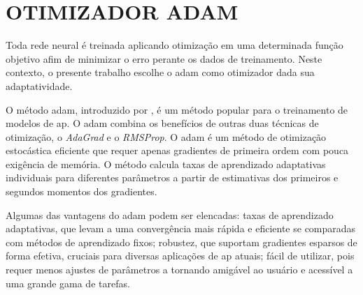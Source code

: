 \section{OTIMIZADOR ADAM}
\label{sec:adam}

Toda rede neural é treinada aplicando otimização em uma determinada função objetivo afim de minimizar o erro perante os dados de treinamento. Neste contexto, o presente trabalho escolhe o \gls{adam} como otimizador dada sua adaptatividade.

O método \gls{adam}, introduzido por , é um método popular para o treinamento de modelos de \gls{ap}. O \gls{adam} combina os benefícios de outras duas técnicas de otimização, o \textit{AdaGrad} e o \textit{RMSProp}. O \gls{adam} é um método de otimização estocástica eficiente que requer apenas gradientes de primeira ordem com pouca exigência de memória. O método calcula taxas de aprendizado adaptativas individuais para diferentes parâmetros a partir de estimativas dos primeiros e segundos momentos dos gradientes.

Algumas das vantagens do \gls{adam} podem ser elencadas: taxas de aprendizado adaptativas, que levam a uma convergência mais rápida e eficiente se comparadas com métodos de aprendizado fixos; robustez, que suportam gradientes esparsos de forma efetiva, cruciais para diversas aplicações de \gls{ap} atuais; fácil de utilizar, pois requer menos ajustes de parâmetros a tornando amigável ao usuário e acessível a uma grande gama de tarefas.
